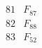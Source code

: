 \documentclass{article}
\begin{document}
{$$\begin{array}{|r|*{7}{r|}}
\\
\hline
81 
 & F_{87} &
 & 
 & 
 & 
 & 
 & 
\\
\hline
82 
 & F_{88} &
 & 
 & 
 & 
 & 
 & 
\\
\hline
83 
 & F_{52} &
 & 
 & 
 & 

\end{array}$$}
\end{document}
